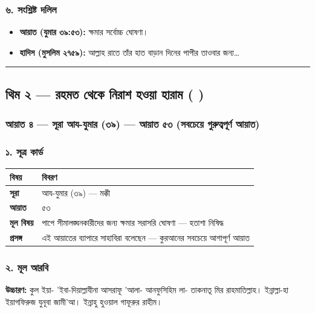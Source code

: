 \subsubsection*{৬. সংশ্লিষ্ট দলিল}

\begin{itemize}
\item \textbf{আয়াত (যুমার ৩৯:৫৩):} ক্ষমার সর্বোচ্চ ঘোষণা।
\item \textbf{হাদিস (মুসলিম ২৭৫৯):} আল্লাহ রাতে তাঁর হাত বাড়ান দিনের পাপীর তাওবার জন্য…
\end{itemize}
\medskip\hrule\medskip

\subsection*{থিম ২ — রহমত থেকে নিরাশ হওয়া হারাম ( )}

\subsubsection*{আয়াত ৪ — সূরা আয-যুমার (৩৯) — আয়াত ৫৩ (সবচেয়ে গুরুত্বপূর্ণ আয়াত)}

\subsubsection*{১. সূত্র কার্ড}

\begin{table}[h]\centering\small
\begin{tabular}{ll}
বিষয় & বিবরণ \\
\hline
\textbf{সূরা} & আয-যুমার (৩৯) — মক্কী \\
\textbf{আয়াত} & ৫৩ \\
\textbf{মূল বিষয়} & পাপে সীমালঙ্ঘনকারীদের জন্য ক্ষমার সরাসরি ঘোষণা — হতাশা নিষিদ্ধ \\
\textbf{প্রসঙ্গ} & এই আয়াতের ব্যাপারে সাহাবিরা বলেছেন — কুরআনের সবচেয়ে আশাপূর্ণ আয়াত \\
\hline
\end{tabular}
\end{table}

\subsubsection*{২. মূল আরবি}

\begin{center}\end{center}
\textbf{উচ্চারণ:} কুল ইয়া- 'ইবা-দিয়াল্লাযীনা আসরাফূ 'আলা- আনফুসিহিম লা- তাকনাতূ মির রাহমাতিল্লাহ। ইন্নাল্লা-হা ইয়াগফিরুজ যুনূবা জামী'আ। ইন্নাহু হুওয়াল গাফূরুর রাহীম।

